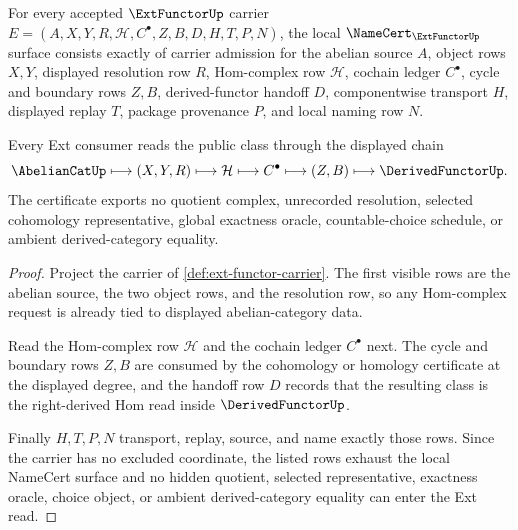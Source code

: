 \begin{theorem}
\label{thm:ext-functor-namecert-obligations}
For every accepted $\ExtFunctorUp$ carrier $E=(A,X,Y,R,\mathcal{H},C^\bullet,Z,B,D,H,T,P,N)$, the local $\NameCert_{\ExtFunctorUp}$ surface consists exactly of carrier admission for the abelian source $A$, object rows $X,Y$, displayed resolution row $R$, Hom-complex row $\mathcal{H}$, cochain ledger $C^\bullet$, cycle and boundary rows $Z,B$, derived-functor handoff $D$, componentwise transport $H$, displayed replay $T$, package provenance $P$, and local naming row $N$.

Every Ext consumer reads the public class through the displayed chain
$$
\AbelianCatUp \longmapsto (X,Y,R) \longmapsto \mathcal{H} \longmapsto C^\bullet \longmapsto (Z,B) \longmapsto \DerivedFunctorUp .
$$
The certificate exports no quotient complex, unrecorded resolution, selected cohomology representative, global exactness oracle, countable-choice schedule, or ambient derived-category equality.
\end{theorem}
\begin{proof}
Project the carrier of \autoref{def:ext-functor-carrier}. The first visible rows are the abelian source, the two object rows, and the resolution row, so any Hom-complex request is already tied to displayed abelian-category data.

Read the Hom-complex row $\mathcal{H}$ and the cochain ledger $C^\bullet$ next. The cycle and boundary rows $Z,B$ are consumed by the cohomology or homology certificate at the displayed degree, and the handoff row $D$ records that the resulting class is the right-derived Hom read inside $\DerivedFunctorUp$.

Finally $H,T,P,N$ transport, replay, source, and name exactly those rows. Since the carrier has no excluded coordinate, the listed rows exhaust the local NameCert surface and no hidden quotient, selected representative, exactness oracle, choice object, or ambient derived-category equality can enter the Ext read.
\end{proof}

